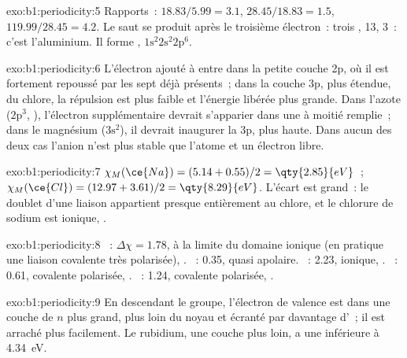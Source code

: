 \begin{solution}{exo:b1:periodicity:5}
Rapports~: $18.83/5.99 = 3.1$, $28.45/18.83 = 1.5$, $119.99/28.45 = 4.2$.
Le saut se produit après le troisième électron~: trois ,  13,  3~: c'est l'aluminium. Il forme ,
$1\text{s}^2 2\text{s}^2
2\text{p}^6$.
\end{solution}

\begin{solution}{exo:b1:periodicity:6}
L'électron ajouté à  entre dans la petite couche 2p, où il est
fortement repoussé par les sept  déjà présents~;
dans la couche 3p, plus étendue, du chlore, la répulsion est plus faible
et l'énergie libérée plus grande. Dans l'azote ($2\text{p}^3$,
), l'électron supplémentaire devrait s'apparier dans une
 à moitié remplie~; dans le magnésium ($3\text{s}^2$), il
devrait inaugurer la  3p, plus haute. Dans aucun des deux cas
l'anion n'est plus stable que l'atome et un électron libre.
\end{solution}

\begin{solution}{exo:b1:periodicity:7}
$\chi_M(\ce{Na}) = (5.14 + 0.55)/2 = \qty{2.85}{eV}$~; $\chi_M(\ce{Cl}) =
(12.97 + 3.61)/2 = \qty{8.29}{eV}$. L'écart est grand~: le doublet d'une
liaison  appartient presque entièrement au chlore, et le
chlorure de sodium est ionique, .
\end{solution}

\begin{solution}{exo:b1:periodicity:8}
~: $\Delta\chi = 1.78$, à la limite du domaine ionique (en
pratique une liaison covalente très polarisée), .
~: 0.35, quasi apolaire. ~: 2.23, ionique, .
~: 0.61, covalente polarisée, .
~: 1.24, covalente polarisée, .
\end{solution}

\begin{solution}{exo:b1:periodicity:9}
En descendant le groupe, l'électron de valence est dans une couche de
$n$ plus grand, plus loin du noyau et écranté par davantage d'~; il est arraché plus facilement. Le rubidium, une couche plus
loin, a une  inférieure à \qty{4.34}{eV}.
\end{solution}

